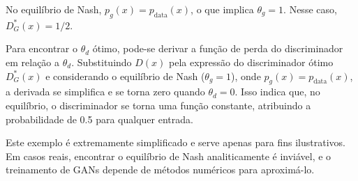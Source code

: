 \documentclass[a4paper]{tufte-handout}
\begin{document}
No equilíbrio de Nash, $p_g(x) = p_{\text{data}}(x)$, o que implica $\theta_g = 1$. Nesse caso, $D^*_G(x) = 1/2$.

Para encontrar o $\theta_d$ ótimo, pode-se derivar a função de perda do discriminador em relação a $\theta_d$. Substituindo $D(x)$ pela expressão do discriminador ótimo $D^*_G(x)$ e considerando o equilíbrio de Nash ($\theta_g = 1$), onde $p_g(x) = p_{\text{data}}(x)$, a derivada se simplifica e se torna zero quando $\theta_d = 0$. Isso indica que, no equilíbrio, o discriminador se torna uma função constante, atribuindo a probabilidade de 0.5 para qualquer entrada.


Este exemplo é extremamente simplificado e serve apenas para fins ilustrativos. Em casos reais, encontrar o equilíbrio de Nash analiticamente é inviável, e o treinamento de GANs depende de métodos numéricos para aproximá-lo.
\end{document}
